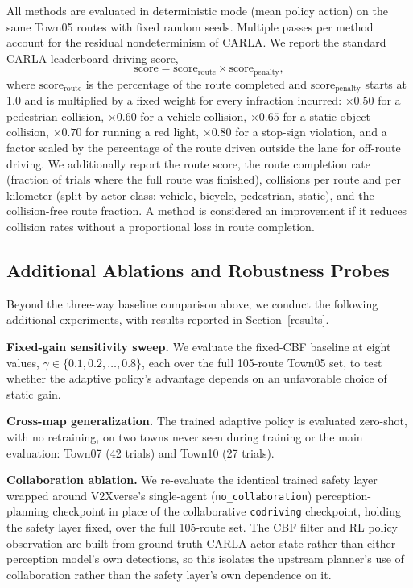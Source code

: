 All methods are evaluated in deterministic mode (mean policy action) on the same Town05 routes with fixed random seeds. Multiple passes per method account for the residual nondeterminism of CARLA. We report the standard CARLA leaderboard driving score,
\begin{equation}
\text{score} = \text{score}_{\text{route}} \times \text{score}_{\text{penalty}},
\end{equation}
where $\text{score}_{\text{route}}$ is the percentage of the route completed and $\text{score}_{\text{penalty}}$ starts at 1.0 and is multiplied by a fixed weight for every infraction incurred: $\times0.50$ for a pedestrian collision, $\times0.60$ for a vehicle collision, $\times0.65$ for a static-object collision, $\times0.70$ for running a red light, $\times0.80$ for a stop-sign violation, and a factor scaled by the percentage of the route driven outside the lane for off-route driving. We additionally report the route score, the route completion rate (fraction of trials where the full route was finished), collisions per route and per kilometer (split by actor class: vehicle, bicycle, pedestrian, static), and the collision-free route fraction. A method is considered an improvement if it reduces collision rates without a proportional loss in route completion.

\subsection{Additional Ablations and Robustness Probes}
\label{sec:additional-ablations}

Beyond the three-way baseline comparison above, we conduct the following additional experiments, with results reported in Section~\ref{results}.

\textbf{Fixed-gain sensitivity sweep.} We evaluate the fixed-CBF baseline at eight values, $\gamma \in \{0.1, 0.2, \dots, 0.8\}$, each over the full 105-route Town05 set, to test whether the adaptive policy's advantage depends on an unfavorable choice of static gain.

\textbf{Cross-map generalization.} The trained adaptive policy is evaluated zero-shot, with no retraining, on two towns never seen during training or the main evaluation: Town07 (42 trials) and Town10 (27 trials).

\textbf{Collaboration ablation.} We re-evaluate the identical trained safety layer wrapped around V2Xverse's single-agent (\texttt{no\_collaboration}) perception-planning checkpoint in place of the collaborative \texttt{codriving} checkpoint, holding the safety layer fixed, over the full 105-route set. The CBF filter and RL policy observation are built from ground-truth CARLA actor state rather than either perception model's own detections, so this isolates the upstream planner's use of collaboration rather than the safety layer's own dependence on it.

